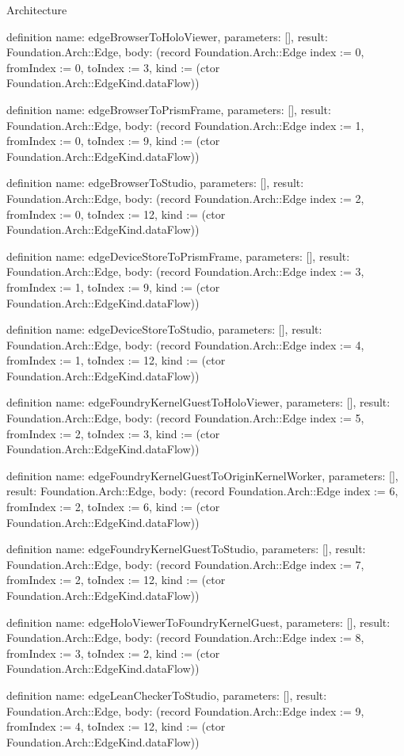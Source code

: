 \begin{lexlean}{Architecture}
\begin{semanticmodule}
definition{
  name: edgeBrowserToHoloViewer,
  parameters: [],
  result: Foundation.Arch::Edge,
  body: (record Foundation.Arch::Edge {index := 0, fromIndex := 0, toIndex := 3, kind := (ctor Foundation.Arch::EdgeKind.dataFlow)})
}

definition{
  name: edgeBrowserToPrismFrame,
  parameters: [],
  result: Foundation.Arch::Edge,
  body: (record Foundation.Arch::Edge {index := 1, fromIndex := 0, toIndex := 9, kind := (ctor Foundation.Arch::EdgeKind.dataFlow)})
}

definition{
  name: edgeBrowserToStudio,
  parameters: [],
  result: Foundation.Arch::Edge,
  body: (record Foundation.Arch::Edge {index := 2, fromIndex := 0, toIndex := 12, kind := (ctor Foundation.Arch::EdgeKind.dataFlow)})
}

definition{
  name: edgeDeviceStoreToPrismFrame,
  parameters: [],
  result: Foundation.Arch::Edge,
  body: (record Foundation.Arch::Edge {index := 3, fromIndex := 1, toIndex := 9, kind := (ctor Foundation.Arch::EdgeKind.dataFlow)})
}

definition{
  name: edgeDeviceStoreToStudio,
  parameters: [],
  result: Foundation.Arch::Edge,
  body: (record Foundation.Arch::Edge {index := 4, fromIndex := 1, toIndex := 12, kind := (ctor Foundation.Arch::EdgeKind.dataFlow)})
}

definition{
  name: edgeFoundryKernelGuestToHoloViewer,
  parameters: [],
  result: Foundation.Arch::Edge,
  body: (record Foundation.Arch::Edge {index := 5, fromIndex := 2, toIndex := 3, kind := (ctor Foundation.Arch::EdgeKind.dataFlow)})
}

definition{
  name: edgeFoundryKernelGuestToOriginKernelWorker,
  parameters: [],
  result: Foundation.Arch::Edge,
  body: (record Foundation.Arch::Edge {index := 6, fromIndex := 2, toIndex := 6, kind := (ctor Foundation.Arch::EdgeKind.dataFlow)})
}

definition{
  name: edgeFoundryKernelGuestToStudio,
  parameters: [],
  result: Foundation.Arch::Edge,
  body: (record Foundation.Arch::Edge {index := 7, fromIndex := 2, toIndex := 12, kind := (ctor Foundation.Arch::EdgeKind.dataFlow)})
}

definition{
  name: edgeHoloViewerToFoundryKernelGuest,
  parameters: [],
  result: Foundation.Arch::Edge,
  body: (record Foundation.Arch::Edge {index := 8, fromIndex := 3, toIndex := 2, kind := (ctor Foundation.Arch::EdgeKind.dataFlow)})
}

definition{
  name: edgeLeanCheckerToStudio,
  parameters: [],
  result: Foundation.Arch::Edge,
  body: (record Foundation.Arch::Edge {index := 9, fromIndex := 4, toIndex := 12, kind := (ctor Foundation.Arch::EdgeKind.dataFlow)})
}


\end{semanticmodule}
\end{lexlean}
